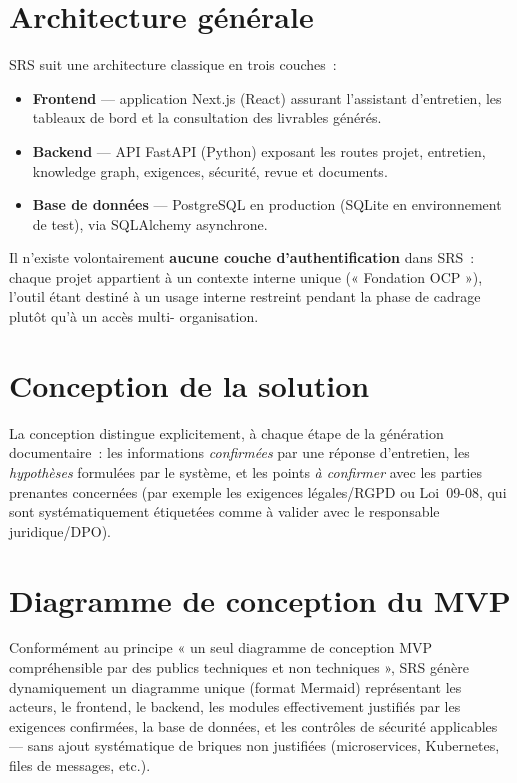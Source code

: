 \section{Architecture générale}
SRS suit une architecture classique en trois couches~:

\begin{itemize}
    \item \textbf{Frontend} — application Next.js (React) assurant l'assistant
    d'entretien, les tableaux de bord et la consultation des livrables générés.
    \item \textbf{Backend} — API FastAPI (Python) exposant les routes projet, entretien,
    knowledge graph, exigences, sécurité, revue et documents.
    \item \textbf{Base de données} — PostgreSQL en production (SQLite en environnement
    de test), via SQLAlchemy asynchrone.
\end{itemize}

Il n'existe volontairement \textbf{aucune couche d'authentification} dans SRS~: chaque
projet appartient à un contexte interne unique (« Fondation OCP »), l'outil étant destiné
à un usage interne restreint pendant la phase de cadrage plutôt qu'à un accès multi-
organisation.

\section{Conception de la solution}
La conception distingue explicitement, à chaque étape de la génération documentaire~:
les informations \emph{confirmées} par une réponse d'entretien, les
\emph{hypothèses} formulées par le système, et les points \emph{à confirmer} avec les
parties prenantes concernées (par exemple les exigences légales/RGPD ou Loi~09-08, qui
sont systématiquement étiquetées comme à valider avec le responsable juridique/DPO).

\section{Diagramme de conception du MVP}
Conformément au principe « un seul diagramme de conception MVP compréhensible par des
publics techniques et non techniques », SRS génère dynamiquement un diagramme unique
(format Mermaid) représentant les acteurs, le frontend, le backend, les modules
effectivement justifiés par les exigences confirmées, la base de données, et les
contrôles de sécurité applicables — sans ajout systématique de briques non justifiées
(microservices, Kubernetes, files de messages, etc.).

